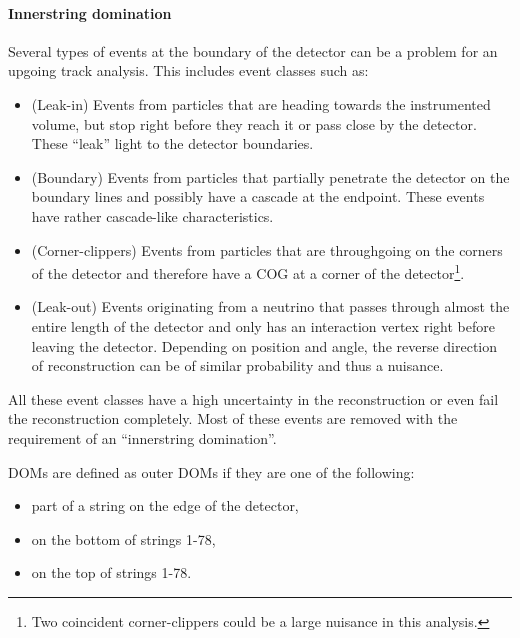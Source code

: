 \paragraph{Innerstring domination}
Several types of events at the boundary of the detector can be a problem for an upgoing track analysis. This includes event classes such as:

\vspace{2mm}
\begin{itemize}
\item (Leak-in) Events from particles that are heading towards the instrumented volume, but stop right before they reach it or pass close by the detector. These ``leak'' light to the detector boundaries.
\item (Boundary) Events from particles that partially penetrate the detector on the boundary lines and possibly have a cascade at the endpoint. These events have rather cascade-like characteristics.
\item (Corner-clippers) Events from particles that are throughgoing on the corners of the detector and therefore have a COG at a corner of the detector\footnote{Two coincident corner-clippers could be a large nuisance in this analysis.}.
\item (Leak-out) Events originating from a neutrino that passes through almost the entire length of the detector and only has an interaction vertex right before leaving the detector. Depending on position and angle, the reverse direction of reconstruction can be of similar probability and thus a nuisance.
\end{itemize}
\vspace{2mm}

\noindent All these event classes have a high uncertainty in the reconstruction or even fail the reconstruction completely. Most of these events are removed with the requirement of an ``innerstring domination''.

DOMs are defined as outer DOMs if they are one of the following:

\vspace{2mm}
\begin{itemize}
\item part of a string on the edge of the detector,
\item on the bottom of strings 1-78,
\item on the top of strings 1-78.
\end{itemize}
\vspace{2mm}


